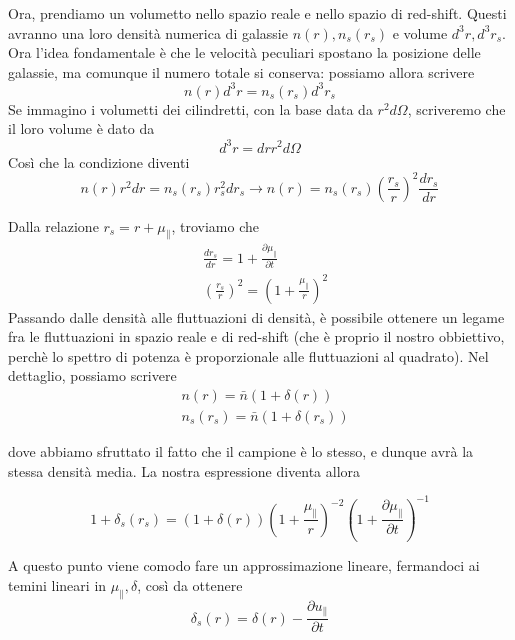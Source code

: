 \documentclass{report}
\begin{document}
Ora, prendiamo un volumetto nello spazio reale e nello spazio di red-shift. Questi avranno una loro densità numerica di galassie $n(r), n_s(r_s)$ e volume $d^3r, d^3r_s$. Ora l'idea fondamentale è che le velocità peculiari spostano la posizione delle galassie, ma comunque il numero totale si conserva: possiamo allora scrivere 
\begin{equation}
    n(r)d^3r = n_s(r_s)d^3r_s 
\end{equation}
Se immagino i volumetti dei cilindretti, con la base data da $r^2d\Omega$, scriveremo che il loro volume è dato da 
\begin{equation}
    d^3r = dr r^2d\Omega
\end{equation}
Così che la condizione diventi 
\begin{equation}
    n(r)r^2dr = n_s(r_s)r_s^2 dr_s \rightarrow n(r) = n_s(r_s)\left(\frac{r_s}{r}\right)^2\frac{dr_s}{dr}
\end{equation}

Dalla relazione $r_s = r + \mu_{\parallel}$, troviamo che 
\begin{align}
    &\frac{dr_s}{dr} = 1 + \frac{\partial \mu_{\parallel}}{\partial t} \\
    &\left(\frac{r_s}{r}\right)^2 = \left(1+\frac{\mu_{\parallel}}{r} \right)^2
\end{align}
Passando dalle densità alle fluttuazioni di densità, è possibile ottenere un legame fra le fluttuazioni in spazio reale e di red-shift (che è proprio il nostro obbiettivo, perchè lo spettro di potenza è proporzionale alle fluttuazioni al quadrato). Nel dettaglio, possiamo scrivere 
\begin{align}
    &n(r) = \bar{n}(1+\delta(r)) \\ &n_s(r_s) = \bar{n}(1+\delta(r_s))
\end{align}

dove abbiamo sfruttato il fatto che il campione è lo stesso, e dunque avrà la stessa densità media. La nostra espressione diventa allora

\begin{equation}
    1 + \delta_s(r_s) = (1+\delta(r))\left(1+\frac{\mu_{\parallel}}{r} \right)^{-2}\left(1 + \frac{\partial \mu_{\parallel}}{\partial t} \right)^{-1}
\end{equation}

A questo punto viene comodo fare un approssimazione lineare, fermandoci ai temini lineari in $\mu_{\parallel}, \delta$, così da ottenere
\begin{equation}
    \delta_s(r) = \delta(r) - \frac{\partial u_{\parallel}}{\partial t}
\end{equation}
\end{document}
